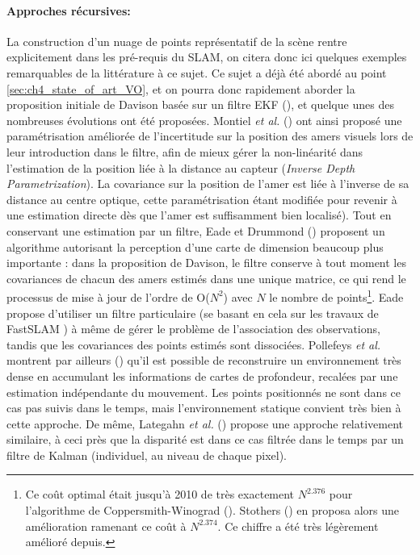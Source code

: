 \paragraph{Approches récursives:\\}
La construction d'un nuage de points représentatif de la scène rentre explicitement dans les pré-requis du SLAM, on citera donc ici quelques exemples remarquables de la littérature à ce sujet. Ce sujet a déjà été abordé au point \ref{sec:ch4_state_of_art_VO}, et on pourra donc rapidement aborder la proposition initiale de Davison basée sur un filtre EKF (\cite{Davison2003}), et quelque unes des nombreuses évolutions ont été proposées. Montiel \textit{et al.} (\cite{Montiel}) ont ainsi proposé une paramétrisation améliorée de l'incertitude sur la position des amers visuels lors de leur introduction dans le filtre, afin de mieux gérer la non-linéarité dans l'estimation de la position liée à la distance au capteur (\emph{Inverse Depth Parametrization}). La covariance sur la position de l'amer est liée à l'inverse de sa distance au centre optique, cette paramétrisation étant modifiée pour revenir à une estimation directe dès que l'amer est suffisamment bien localisé). Tout en conservant une estimation par un filtre, Eade et Drummond (\cite{Eade}) proposent un algorithme autorisant la perception d'une carte de dimension beaucoup plus importante : dans la proposition de Davison, le filtre conserve à tout moment les covariances de chacun des amers estimés dans une unique matrice, ce qui rend le processus de mise à jour de l'ordre de O($N^2$) avec $N$ le nombre de points\footnote{Ce coût optimal était jusqu'à 2010 de très exactement $N^{2.376}$ pour l'algorithme de Coppersmith-Winograd (\cite{Coppersmith1990}). Stothers (\cite{Stothers2010}) en proposa alors une amélioration ramenant ce coût à $N^{2.374}$. Ce chiffre a été très légèrement amélioré depuis.}. Eade propose d'utiliser un filtre particulaire (se basant en cela sur les travaux de FastSLAM \cite{Thrun2004a}) à même de gérer le problème de l'association des observations, tandis que les covariances des points estimés sont dissociées. Pollefeys \textit{et al.} montrent par ailleurs (\cite{Pollefeys2007}) qu'il est possible de reconstruire un environnement très dense en accumulant les informations de cartes de profondeur, recalées par une estimation indépendante du mouvement. Les points positionnés ne sont dans ce cas pas suivis dans le temps, mais l'environnement statique convient très bien à cette approche. De même, Lategahn \textit{et al.} (\cite{Lategahn2011}) propose une approche relativement similaire, à ceci près que la disparité est dans ce cas filtrée dans le temps par un filtre de Kalman (individuel, au niveau de chaque pixel).\\

